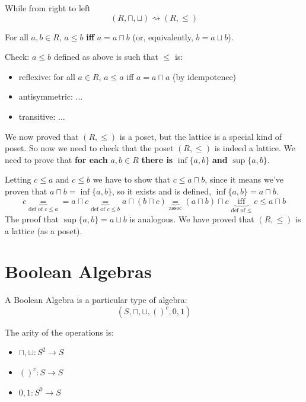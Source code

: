 	\newpage

	While from right to left
	$$ (R, \sqcap, \sqcup ) \rightsquigarrow (R, \leq) $$

	For all $a,b \in R$, $a \leq b$ \textbf{iff} $a = a\sqcap b$ (or, equivalently, $b = a \sqcup b$).

	Check: $a \leq b$ defined as above is such that $\leq$ is:
	\begin{itemize}
		\item reflexive: for all $a \in R$, $a \leq a$ iff $a = a \sqcap a$ (by idempotence)
		\item antisymmetric: ...
		\item transitive: ...
	\end{itemize}

	We now proved that $(R, \leq)$ is a poset, but the lattice is a special kind of poset. So now we need to check that the poset $(R, \leq)$ is indeed a lattice. We need to prove that \textbf{for each} $a,b \in R$ \textbf{there is} $\inf\{a,b\}$ \textbf{and} $\sup \{a,b\}$.

	Letting $c \leq a$ and $c \leq b$ we have to show that $c \leq a \sqcap b$, since it means we've proven that $a \sqcap b = \inf\{a,b\}$, so it exists and is defined, $\inf\{a,b\} = a \sqcap b$.\\
	$$ c \underbrace{=}_{\text{def of } c \leq a} = a \sqcap c \underbrace{=}_{\text{def of } c \leq b} a \sqcap (b \sqcap c) \underbrace{=}_{\text{assoc}} (a \sqcap b) \sqcap c \; \underbrace{\text{ iff }}_{\text{def of } \leq} \; c \leq a \sqcap b$$
	The proof that $\sup\{a,b\} = a \sqcup b$ is analogous. We have proved that $(R, \leq)$ is a lattice (as a poset).

	\section{Boolean Algebras}

	A Boolean Algebra is a particular type of algebra:
	$$ (S, \sqcap, \sqcup, ()^c, 0, 1 ) $$

	\noindent
	The arity of the operations is:
	\begin{itemize}
		\item $\sqcap, \sqcup : S^2 \rightarrow S$
		\item $()^c: S \rightarrow S$ 
		\item $0,1: S^0 \rightarrow S$
	\end{itemize}

